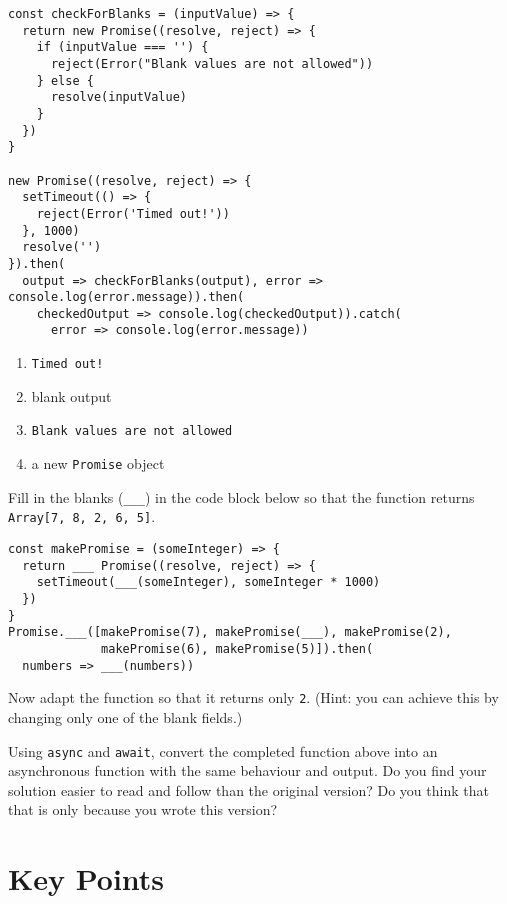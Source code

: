 \begin{verbatim}
const checkForBlanks = (inputValue) => {
  return new Promise((resolve, reject) => {
    if (inputValue === '') {
      reject(Error("Blank values are not allowed"))
    } else {
      resolve(inputValue)
    }
  })
}

new Promise((resolve, reject) => {
  setTimeout(() => {
    reject(Error('Timed out!'))
  }, 1000)
  resolve('')
}).then(
  output => checkForBlanks(output), error => console.log(error.message)).then(
    checkedOutput => console.log(checkedOutput)).catch(
      error => console.log(error.message))
\end{verbatim}

\begin{enumerate}
\item
  \texttt{Timed\ out!}
\item
  blank output
\item
  \texttt{Blank\ values\ are\ not\ allowed}
\item
  a new \texttt{Promise} object
\end{enumerate}


Fill in the blanks (\texttt{\_\_\_}) in the code block below so that
the function returns \texttt{Array{[}7,\ 8,\ 2,\ 6,\ 5{]}}.

\begin{verbatim}
const makePromise = (someInteger) => {
  return ___ Promise((resolve, reject) => {
    setTimeout(___(someInteger), someInteger * 1000)
  })
}
Promise.___([makePromise(7), makePromise(___), makePromise(2),
             makePromise(6), makePromise(5)]).then(
  numbers => ___(numbers))
\end{verbatim}

Now adapt the function so that it returns only \texttt{2}.
(Hint: you can achieve this by changing only one of the blank fields.)


Using \texttt{async} and \texttt{await},
convert the completed function above into an asynchronous function with the same behaviour and output.
Do you find your solution easier to read and follow than the original version?
Do you think that that is only because you wrote this version?

\section*{Key Points}


